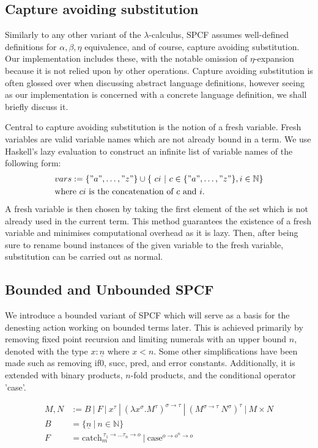 \documentclass[12pt,a4paper]{report}
\theoremstyle{definition}
\theoremstyle{definition}
\theoremstyle{remark}
\begin{document}
\subsection{Capture avoiding substitution}
Similarly to any other variant of the $\lambda$-calculus, SPCF assumes well-defined definitions for $\alpha, \beta, \eta$ equivalence, and of course, capture avoiding substitution. Our implementation includes these, with the notable omission of $\eta$-expansion because it is not relied upon by other operations. Capture avoiding substitution is often glossed over when discussing abstract language definitions, however seeing as our implementation is concerned with a concrete language definition, we shall briefly discuss it.

Central to capture avoiding substitution is the notion of a fresh variable. Fresh variables are valid variable names which are not already bound in a term. We use Haskell's lazy evaluation to construct an infinite list of variable names of the following form: 
\[
\begin{split}
&vars := \{"a", \dots, "z"\} \cup \{\ ci\ |\ c \in \{"a", \dots, "z"\}, i \in \mathbb{N}\} \\
&\text{where $ci$ is the concatenation of $c$ and $i$.}
\end{split}
\]
A fresh variable is then chosen by taking the first element of the set which is not already used in the current term. This method guarantees the existence of a fresh variable and minimises computational overhead as it is lazy. Then, after being sure to rename bound instances of the given variable to the fresh variable, substitution can be carried out as normal.

\subsection{Bounded and Unbounded SPCF}
We introduce a bounded variant of SPCF which will serve as a basis for the denesting action working on bounded terms later. This is achieved primarily by removing fixed point recursion and limiting numerals with an upper bound $n$, denoted with the type $x: \underline{n}$ where $x<n$. Some other simplifications have been made such as removing if0, succ, pred, and error constants. Additionally, it is extended with binary products, $n$-fold products, and the conditional operator 'case'.  

\begin{equation} \label{eq:bounded_spcf_grammar}
\begin{split}
    M,N &:= B\ |\ F\ |\ x^{\tau}\ |\ (\lambda x^{\sigma} .M^{\tau})^{\sigma \rightarrow \tau}\ |\ (M^{\sigma \rightarrow \tau} \ N^{\sigma})^{\tau}\ | \ M \times N\\
    B &= \{\underline{n}\ |\ n\in \mathbb{N}\}\\
    F &= \text{catch}_{m}^{\ \tau_1 \rightarrow \dots \tau_n \rightarrow o}\ |\ \text{case}^{o \rightarrow o^n \rightarrow o}\\
\end{split}
\end{equation}
\end{document}
